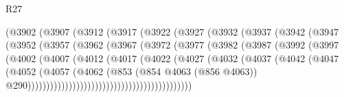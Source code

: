 \begin{lexlean}{R27}
\begin{coremodule}
                        (@3902
                          (@3907
                            (@3912
                              (@3917
                                (@3922
                                  (@3927
                                    (@3932
                                      (@3937
                                        (@3942
                                          (@3947
                                            (@3952
                                              (@3957
                                                (@3962
                                                  (@3967
                                                    (@3972
                                                      (@3977
                                                        (@3982
                                                          (@3987
                                                            (@3992
                                                              (@3997
                                                                (@4002
                                                                  (@4007
                                                                    (@4012
                                                                      (@4017
                                                                        (@4022
                                                                          (@4027
                                                                            (@4032
                                                                              (@4037
                                                                                (@4042
                                                                                  (@4047
                                                                                    (@4052
                                                                                      (@4057
                                                                                        (@4062
                                                                                          (@853
                                                                                            (@854
                                                                                              @4063
                                                                                              (@856
                                                                                                @4063))
                                                                                            @290))))))))))))))))))))))))))))))))))))))))))))

\end{coremodule}
\end{lexlean}
